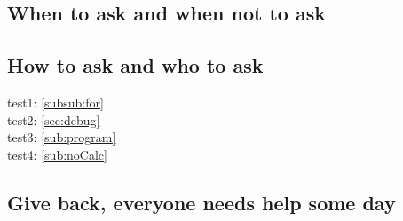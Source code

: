 \subsection{When to ask and when not to ask}
\label{sub:whenAsk}

\subsection{How to ask and who to ask}
\label{sub:whoAsk}

test1: \ref{subsub:for}\\
test2: \ref{sec:debug}\\
test3: \ref{sub:program}\\
test4: \ref{sub:noCalc}\\

\subsection{Give back, everyone needs help some day}
\label{sub:gibHelp}
